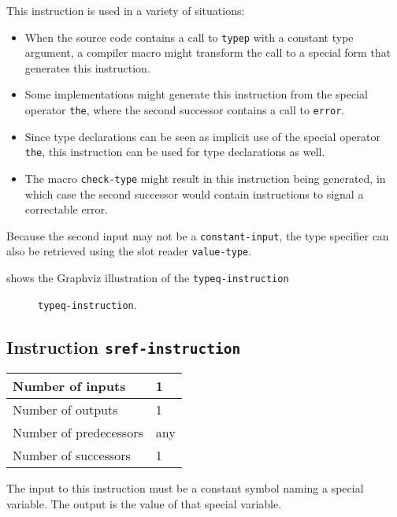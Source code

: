 This instruction is used in a variety of situations:

\begin{itemize}
\item When the source code contains a call to \texttt{typep} with a
  constant type argument, a compiler macro might transform the call to
  a special form that generates this instruction.
\item Some implementations might generate this instruction from the
  special operator \texttt{the}, where the second successor contains a
  call to \texttt{error}.
\item Since type declarations can be seen as implicit use of the
  special operator \texttt{the}, this instruction can be used for type
  declarations as well.
\item The macro \texttt{check-type} might result in this instruction
  being generated, in which case the second successor would contain
  instructions to signal a correctable error.
\end{itemize}

Because the second input may not be a \texttt{constant-input}, the
type specifier can also be retrieved using the slot reader
\texttt{value-type}. 

 shows the Graphviz illustration of the
\texttt{typeq-instruction}

\begin{figure}
\begin{center}
\end{center}
\caption{\label{fig-typeq-instruction}
\texttt{typeq-instruction}.}
\end{figure}

\subsection{Instruction \texttt{sref-instruction}}
\label{mir-instruction-sref}

\begin{tabular}{|l|l|}
\hline
Number of inputs & 1\\
\hline
Number of outputs & 1\\
\hline
Number of predecessors & any\\
\hline
Number of successors & 1\\
\hline
\end{tabular}

The input to this instruction must be a constant symbol naming a
special variable.  The output is the value of that special variable.

